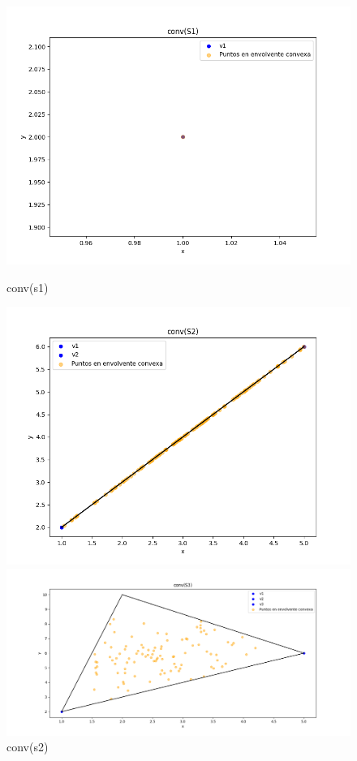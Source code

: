 \documentclass{article}
\begin{document}
\begin{figure}[H]
   \centering
    \begin{minipage}{0.45\textwidth}
        \centering
        \includegraphics[width=\textwidth]{imagenes/conv(s1).png}
        \caption{conv(s1)}
        \label{fig:grafico1}
    \end{minipage}
    \hfill
    \begin{minipage}{0.45\textwidth}
        \centering
        \includegraphics[width=\textwidth]{imagenes/conv(s2).png}
        \caption{conv(s2)}
        \label{fig:grafico2}
    \end{minipage}
\begin{minipage}{0.45\textwidth}
        \centering
        \includegraphics[width=\textwidth]{imagenes/conv(s3).png}

\end{minipage}
\end{figure}
\end{document}
